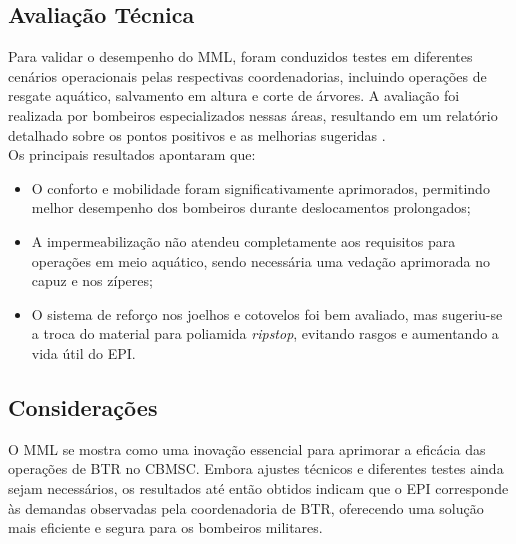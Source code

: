 \begin{centering}
\end{centering}

\subsection{Avaliação Técnica}

Para validar o desempenho do \acrlong{MML}, foram conduzidos testes em diferentes cenários operacionais pelas respectivas coordenadorias, incluindo operações de resgate aquático, salvamento em altura e corte de árvores. A avaliação foi realizada por bombeiros especializados nessas áreas, resultando em um relatório detalhado sobre os pontos positivos e as melhorias sugeridas \cite{relMML}.
\\
Os principais resultados apontaram que:
\begin{itemize}
    \item O conforto e mobilidade foram significativamente aprimorados, permitindo melhor desempenho dos bombeiros durante deslocamentos prolongados;
    \item A impermeabilização não atendeu completamente aos requisitos para operações em meio aquático, sendo necessária uma vedação aprimorada no capuz e nos zíperes;
    \item O sistema de reforço nos joelhos e cotovelos foi bem avaliado, mas sugeriu-se a troca do material para poliamida \textit{ripstop}, evitando rasgos e aumentando a vida útil do \acrshort{EPI}.
\end{itemize}

    

\subsection{Considerações}
O \acrlong{MML} se mostra como uma inovação essencial para aprimorar a eficácia das operações de \acrlong{BTR} no \acrshort{CBMSC}. Embora ajustes técnicos e diferentes testes ainda sejam necessários, os resultados até então obtidos indicam que o \acrshort{EPI} corresponde às demandas observadas pela coordenadoria de \acrshort{BTR}, oferecendo uma solução mais eficiente e segura para os bombeiros militares.